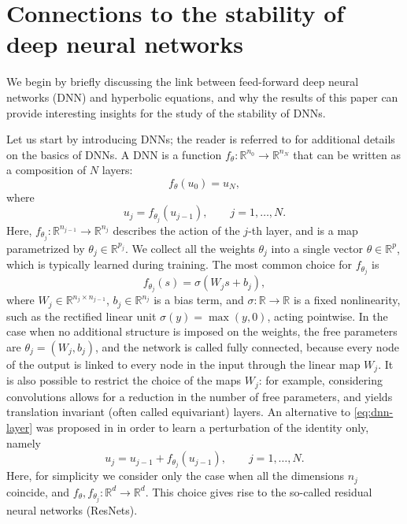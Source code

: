 \documentclass{article}
\theoremstyle{definition}
\newcommand{\R}{\mathbb{R}}
\begin{document}
\section{Connections to the stability of deep neural networks}\label{sec:deep}

We begin by briefly discussing the link between feed-forward deep neural networks (DNN) and hyperbolic equations, and why the results of this paper can provide interesting insights for the study of the stability of DNNs. 

Let us start by introducing DNNs; the reader is referred to \cite{Goodfellow-et-al-2016,higham-etal-2019} for additional details on the basics of DNNs. A DNN is a function  $f_\theta\colon\R^{n_0}\to\R^{n_N} $ that can be written as a composition of $N$ layers:
\[
f_\theta(u_0)=u_N,
\]
where
\begin{equation}\label{eq:dnn-layer}
u_{j}=f_{\theta_j}(u_{j-1}),\qquad j=1,\dots,N.
\end{equation}
Here, $f_{\theta_j}\colon\R^{n_{j-1}}\to\R^{n_{j}}$ describes the action of the $j$-th layer, and is a map parametrized by $\theta_j\in\R^{p_j}$. We collect all the weights $\theta_j$ into a single vector $\theta\in\R^p$, which is typically learned during training. The most common choice for $f_{\theta_j}$ is 
\[
f_{\theta_j}(s) = \sigma(W_j s+b_j),
\]
where $W_j\in\R^{n_j\times n_{j-1}}$, $b_j\in \R^{n_j}$ is a bias term, and $\sigma\colon\R\to\R$ is a fixed nonlinearity, such as the rectified linear unit $\sigma(y)=\max(y,0)$, acting pointwise. In the case when no additional structure is imposed on the weights, the free parameters are $\theta_j = (W_j,b_j)$, and the network is called fully connected, because every node of the output is linked to every node in the input through the linear map $W_j$. It is also possible to restrict the choice of the maps $W_j$: for example, considering convolutions allows for a reduction in the number of free parameters, and yields translation invariant (often called equivariant) layers.  
An alternative to \eqref{eq:dnn-layer} was proposed in \cite{ResNets} in order to learn a perturbation of the identity only, namely
\begin{equation}\label{eq:resnet-layer}
u_{j}=u_{j-1}+f_{\theta_j}(u_{j-1}),\qquad j=1,\dots,N.
\end{equation}
Here, for simplicity we consider only the case when all the dimensions $n_j$ coincide, and $f_\theta,f_{\theta_j}\colon\R^d\to\R^d$. This choice gives rise to the so-called residual neural networks (ResNets).
\end{document}
